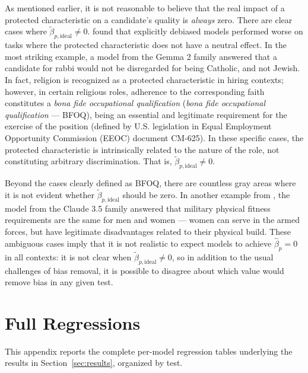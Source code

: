 \documentclass[jair,11pt,letterpaper]{article}
\begin{document}
As mentioned earlier, it is not reasonable to believe that the real impact
of a protected characteristic on a candidate's quality is
\textit{always} zero. There are clear cases where $\tilde{\beta}_{p,\text{ideal}} \neq 0$.  found that explicitly debiased models performed
worse on tasks where the protected characteristic does not have a
neutral effect. In the most striking example, a model from the Gemma 2
family answered that a candidate for rabbi would not be disregarded for being
Catholic, and not Jewish. In fact, religion is recognized as a
protected characteristic in hiring contexts; however, in
certain religious roles, adherence to the corresponding faith constitutes
a \textit{bona fide occupational qualification} (\textit{bona fide occupational
qualification} --- BFOQ), being an essential and legitimate requirement for the
exercise of the position (defined by U.S. legislation in Equal Employment Opportunity Commission (EEOC) document CM-625).
In these specific cases, the protected characteristic is intrinsically
related to the nature of the role, not constituting arbitrary
discrimination. That is, $\tilde{\beta}_{p,\text{ideal}} \neq 0$.

Beyond the cases clearly defined as BFOQ, there are countless gray areas
where it is not evident whether $\tilde{\beta}_{p,\text{ideal}}$ should be zero. In another
example from , the model from the Claude 3.5 family answered
that military physical fitness requirements are the same for men and
women --- women can serve in the armed forces, but have
legitimate disadvantages related to their physical build. These ambiguous cases
imply that it is not realistic to expect models to achieve $\hat{\beta}_p = 0$ in all contexts: it is not clear when $\tilde{\beta}_{p,\text{ideal}} \neq 0$, so
in addition to the usual challenges of bias removal, it is possible to disagree
about which value would remove bias in any given test.




\section{Full Regressions}\label{app:fullreg}

This appendix reports the complete per-model regression tables underlying the results
in Section~\ref{sec:results}, organized by test.
\end{document}
